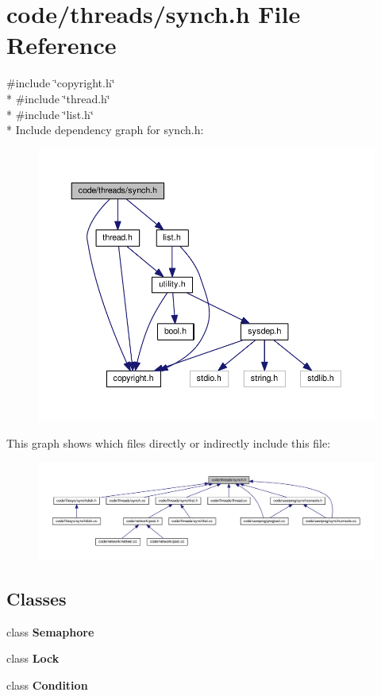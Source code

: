 \section{code/threads/synch.h File Reference}
\label{synch_8h}
{\ttfamily \#include \char`\"{}copyright.\+h\char`\"{}}\\*
{\ttfamily \#include \char`\"{}thread.\+h\char`\"{}}\\*
{\ttfamily \#include \char`\"{}list.\+h\char`\"{}}\\*
Include dependency graph for synch.\+h\+:
\nopagebreak
\begin{figure}[H]
\begin{center}
\leavevmode
\includegraphics[width=350pt]{synch_8h__incl}
\end{center}
\end{figure}
This graph shows which files directly or indirectly include this file\+:
\nopagebreak
\begin{figure}[H]
\begin{center}
\leavevmode
\includegraphics[width=350pt]{synch_8h__dep__incl}
\end{center}
\end{figure}
\subsection*{Classes}
\begin{DoxyCompactItemize}
\item 
class {\bf Semaphore}
\item 
class {\bf Lock}
\item 
class {\bf Condition}
\end{DoxyCompactItemize}
